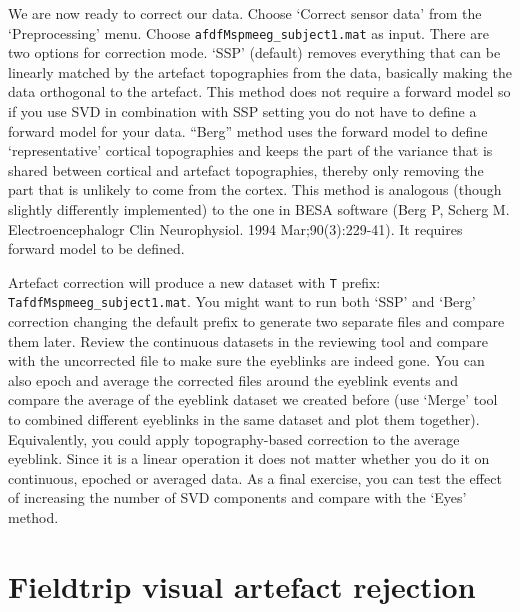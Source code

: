 We are now ready to correct our data. Choose `Correct sensor data' from the `Preprocessing' menu. Choose \texttt{afdfMspmeeg\_subject1.mat} as input. There are two options for correction mode. `SSP' (default) removes everything that can be linearly matched by the artefact topographies from the data, basically making the data orthogonal to the artefact. This method does not require a forward model so if you use SVD in combination with SSP setting you do not have to define a forward model for your data. ``Berg'' method uses the forward model to define `representative' cortical topographies and keeps the part of the variance that is shared between cortical and artefact topographies, thereby only removing the part that is unlikely to come from the cortex. This method is analogous (though slightly differently implemented) to the one in BESA software (Berg P, Scherg M. Electroencephalogr Clin Neurophysiol. 1994 Mar;90(3):229-41). It requires forward model to be defined.

Artefact correction will produce a new dataset with \texttt{T} prefix: \texttt{TafdfMspmeeg\_subject1.mat}. You might want to run both `SSP' and `Berg' correction changing the default prefix to generate two separate files and compare them later. Review the continuous datasets in the reviewing tool and compare with the uncorrected file to make sure the eyeblinks are indeed gone. You can also epoch and average the corrected files around the eyeblink events and compare the average of the eyeblink dataset we created before (use `Merge' tool to combined different eyeblinks in the same dataset and plot them together). Equivalently, you could apply topography-based correction to the average eyeblink. Since it is a linear operation it does not matter whether you do it on continuous, epoched or averaged data. As a final exercise, you can test the effect of increasing the number of SVD components and compare with the `Eyes' method. 


\section{Fieldtrip visual artefact rejection}

